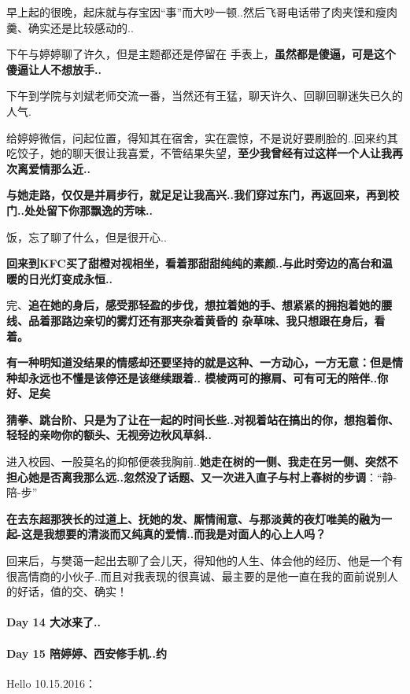 \documentclass[UTF8,a4paper,8pt]{ctexbook}
\begin{document}
	 	 早上起的很晚，起床就与存宝因“事”而大吵一顿..然后飞哥电话带了肉夹馍和瘦肉羹、确实还是比较感动的..
	 	 
	 	 下午与婷婷聊了许久，但是主题都还是停留在 手表上，\textbf{虽然都是傻逼，可是这个傻逼让人不想放手..}
	 	 
	 	 下午到学院与刘斌老师交流一番，当然还有王猛，聊天许久、回聊回聊迷失已久的人气.
	 	 
	 	 给婷婷微信，问起位置，得知其在宿舍，实在震惊，不是说好要刷脸的..回来约其吃饺子，她的聊天很让我喜爱，不管结果失望，\textbf{至少我曾经有过这样一个人让我再次离爱情那么近..}
	 	 
	 	 \textbf{与她走路，仅仅是并肩步行，就足足让我高兴..我们穿过东门，再返回来，再到校门..处处留下你那飘逸的芳味..}
	 	 
	 	 饭，忘了聊了什么，但是很开心..
	 	 
	 	 \textbf{回来到KFC买了甜橙对视相坐，看着那甜甜纯纯的素颜..与此时旁边的高台和温暖的日光灯变成永恒..}
	 	 
	 	 完、\textbf{追在她的身后，感受那轻盈的步伐，想拉着她的手、想紧紧的拥抱着她的腰线、品着那路边亲切的雾灯还有那夹杂着黄昏的 杂草味、我只想跟在身后，看着。}
	 	 
	 	 \textbf{有一种明知道没结果的情感却还要坚持的就是这种、一方动心，一方无意：但是情种却永远也不懂是该停还是该继续跟着.. 模棱两可的擦肩、可有可无的陪伴..你好、足矣}
	 	 
	 	 \textbf{猜拳、跳台阶、只是为了让在一起的时间长些..对视着站在搞出的你，想抱着你、轻轻的亲吻你的额头、无视旁边秋风草斜..}
	 	 
	 	 进入校园、一股莫名的抑郁便袭我胸前..\textbf{她走在树的一侧、我走在另一侧、突然不担心她是否离我那么远..忽然没了话题、又一次进入直子与村上春树的步调}：“静-陪-步”
	 	 
	 	 \textbf{在去东超那狭长的过道上、抚她的发、厮情闹意、与那淡黄的夜灯唯美的融为一起-这是我想要的清淡而又纯真的爱情..而我是对面人的心上人吗？}
	 	 
	 	 回来后，与樊蔼一起出去聊了会儿天，得知他的人生、体会他的经历、他是一个有很高情商的小伙子..而且对我表现的很真诚、最主要的是他一直在我的面前说别人的好话，值的交、确实！
 	 \paragraph{Day 14   大冰来了..   \quad     }
	 	 
 	 \paragraph{Day 15   陪婷婷、西安修手机..约   \quad     }
	 	 Hello 10.15.2016：
	 	 
\end{document}
